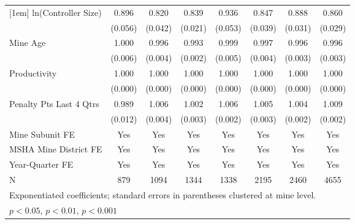 {\begin{tabular}{l*{7}{c}}
[1em]
ln(Controller Size)      &       0.896         &       0.820\sym{***}&       0.839\sym{***}&       0.936         &       0.847\sym{***}&       0.888\sym{***}&       0.860\sym{***}\\
                         &     (0.056)         &     (0.042)         &     (0.021)         &     (0.053)         &     (0.039)         &     (0.031)         &     (0.029)         \\
[1em]
Mine Age                 &       1.000         &       0.996         &       0.993\sym{**} &       0.999         &       0.997         &       0.996         &       0.996         \\
                         &     (0.006)         &     (0.004)         &     (0.002)         &     (0.005)         &     (0.004)         &     (0.003)         &     (0.003)         \\
[1em]
Productivity             &       1.000         &       1.000         &       1.000         &       1.000         &       1.000         &       1.000\sym{*}  &       1.000         \\
                         &     (0.000)         &     (0.000)         &     (0.000)         &     (0.000)         &     (0.000)         &     (0.000)         &     (0.000)         \\
[1em]
Penalty Pts Last 4 Qtrs  &       0.989         &       1.006         &       1.002         &       1.006\sym{*}  &       1.005         &       1.004\sym{*}  &       1.009\sym{***}\\
                         &     (0.012)         &     (0.004)         &     (0.003)         &     (0.002)         &     (0.003)         &     (0.002)         &     (0.002)         \\
[1em]
Mine Subunit FE          &         Yes         &         Yes         &         Yes         &         Yes         &         Yes         &         Yes         &         Yes         \\
[1em]
MSHA Mine District FE    &         Yes         &         Yes         &         Yes         &         Yes         &         Yes         &         Yes         &         Yes         \\
[1em]
Year-Quarter FE          &         Yes         &         Yes         &         Yes         &         Yes         &         Yes         &         Yes         &         Yes         \\
\hline
N                        &         879         &        1094         &        1344         &        1338         &        2195         &        2460         &        4655         \\
\hline\hline
\multicolumn{8}{l}{\footnotesize Exponentiated coefficients; standard errors in parentheses clustered at mine level.}\\
\multicolumn{8}{l}{\footnotesize \sym{*} \(p<0.05\), \sym{**} \(p<0.01\), \sym{***} \(p<0.001\)}\\
\end{tabular}
}

